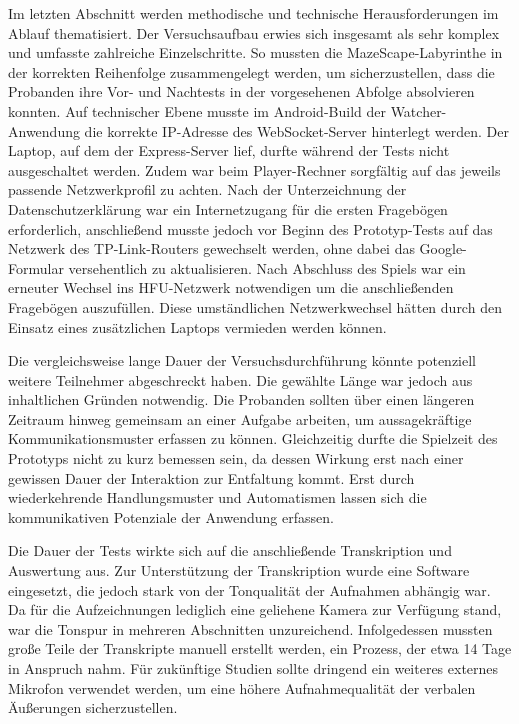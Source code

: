 Im letzten Abschnitt werden methodische und technische Herausforderungen im Ablauf thematisiert. Der Versuchsaufbau erwies sich insgesamt als sehr komplex und umfasste zahlreiche Einzelschritte. So mussten die MazeScape-Labyrinthe in der korrekten Reihenfolge zusammengelegt werden, um sicherzustellen, dass die Probanden ihre Vor- und Nachtests in der vorgesehenen Abfolge absolvieren konnten. Auf technischer Ebene musste im Android-Build der Watcher-Anwendung die korrekte IP-Adresse des WebSocket-Server hinterlegt werden. Der Laptop, auf dem der Express-Server lief, durfte während der Tests nicht ausgeschaltet werden. Zudem war beim Player-Rechner sorgfältig auf das jeweils passende Netzwerkprofil zu achten. Nach der Unterzeichnung der Datenschutzerklärung war ein Internetzugang für die ersten Fragebögen erforderlich, anschließend musste jedoch vor Beginn des Prototyp-Tests auf das Netzwerk des TP-Link-Routers gewechselt werden, ohne dabei das Google-Formular versehentlich zu aktualisieren. Nach Abschluss des Spiels war ein erneuter Wechsel ins \ac{HFU}-Netzwerk notwendigen um die anschließenden Fragebögen auszufüllen. Diese umständlichen Netzwerkwechsel hätten durch den Einsatz eines  zusätzlichen Laptops vermieden werden können.

Die vergleichsweise lange Dauer der Versuchsdurchführung könnte potenziell weitere Teilnehmer abgeschreckt haben. Die gewählte Länge war jedoch aus inhaltlichen Gründen notwendig. Die Probanden sollten über einen längeren Zeitraum hinweg gemeinsam an einer Aufgabe arbeiten, um aussagekräftige Kommunikationsmuster erfassen zu können. Gleichzeitig durfte die Spielzeit des Prototyps nicht zu kurz bemessen sein, da dessen Wirkung erst  nach einer gewissen Dauer der Interaktion zur Entfaltung kommt. Erst durch wiederkehrende Handlungsmuster und Automatismen lassen sich die kommunikativen Potenziale der Anwendung erfassen.

Die Dauer der Tests wirkte sich auf die anschließende Transkription und Auswertung aus. Zur Unterstützung der Transkription wurde eine Software eingesetzt, die jedoch stark von der Tonqualität der Aufnahmen abhängig war. Da für die Aufzeichnungen lediglich eine geliehene Kamera zur Verfügung stand, war die Tonspur in mehreren Abschnitten unzureichend. Infolgedessen mussten große Teile der Transkripte manuell erstellt werden, ein Prozess, der etwa 14 Tage in Anspruch nahm. Für zukünftige Studien sollte dringend ein weiteres externes Mikrofon verwendet werden, um eine höhere Aufnahmequalität der verbalen Äußerungen sicherzustellen.

